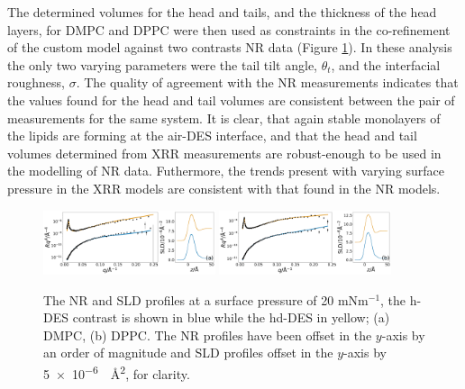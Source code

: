 \documentclass[%
 reprint,
 amsmath,amssymb,
 prl,
]{revtex4-1}
\begin{document}
The determined volumes for the head and tails, and the thickness of the head layers, for DMPC and DPPC were then used as constraints in the co-refinement of the custom model against two contrasts NR data (Figure \ref{fig:neutron}). In these analysis the only two varying parameters were the tail tilt angle, $\theta_t$, and the interfacial roughness, $\sigma$.
The quality of agreement with the NR measurements indicates that the values found for the head and tail volumes are consistent between the pair of measurements for the same system.
It is clear, that again stable monolayers of the lipids are forming at the air-DES interface, and that the head and tail volumes determined from XRR measurements are robust-enough to be used in the modelling of NR data.
Futhermore, the trends present with varying surface pressure in the XRR models are consistent with that found in the NR models.
%
\begin{figure}
	\centering
	\includegraphics[width=0.45\textwidth]{figures/dmpc_20n_ref_sld}
	\includegraphics[width=0.45\textwidth]{figures/dppc_20n_ref_sld}
	\caption{The NR and SLD profiles at a surface pressure of 20 mNm$^{-1}$, the h-DES contrast is shown in blue while the hd-DES in yellow; (a) DMPC, (b) DPPC. The NR profiles have been offset in the $y$-axis by an order of magnitude and SLD profiles offset in the $y$-axis by \SI{5e-6}{\per\square\angstrom}, for clarity.}
	\label{fig:neutron}
\end{figure}
%
%
\end{document}
